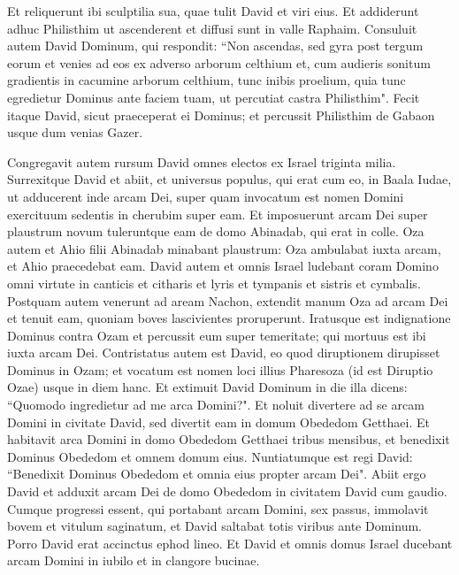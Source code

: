 \begin{biblechapter}
\verse Et reliquerunt ibi sculptilia sua, quae tulit David et viri eius. 
\verse Et addiderunt adhuc Philisthim ut ascenderent et diffusi sunt in valle Raphaim. 
\verse Consuluit autem David Dominum, qui respondit: “Non ascendas, sed gyra post tergum eorum et venies ad eos ex adverso arborum celthium 
\verse et, cum audieris sonitum gradientis in cacumine arborum celthium, tunc inibis proelium, quia tunc egredietur Dominus ante faciem tuam, ut percutiat castra Philisthim". 
\verse Fecit itaque David, sicut praeceperat ei Dominus; et percussit Philisthim de Gabaon usque dum venias Gazer. 
\end{biblechapter}

\begin{biblechapter}  
\verse Congregavit autem rursum David omnes electos ex Israel triginta milia. 
\verse Surrexitque David et abiit, et universus populus, qui erat cum eo, in Baala Iudae, ut adducerent inde arcam Dei, super quam invocatum est nomen Domini exercituum sedentis in cherubim super eam. 
\verse Et imposuerunt arcam Dei super plaustrum novum tuleruntque eam de domo Abinadab, qui erat in colle. Oza autem et Ahio filii Abinadab minabant plaustrum: 
\verse Oza ambulabat iuxta arcam, et Ahio praecedebat eam. 
\verse David autem et omnis Israel ludebant coram Domino omni virtute in canticis et citharis et lyris et tympanis et sistris et cymbalis. 
\verse Postquam autem venerunt ad aream Nachon, extendit manum Oza ad arcam Dei et tenuit eam, quoniam boves lascivientes proruperunt. 
\verse Iratusque est indignatione Dominus contra Ozam et percussit eum super temeritate; qui mortuus est ibi iuxta arcam Dei. 
\verse Contristatus autem est David, eo quod diruptionem dirupisset Dominus in Ozam; et vocatum est nomen loci illius Pharesoza (id est Diruptio Ozae) usque in diem hanc. 
\verse Et extimuit David Dominum in die illa dicens: “Quomodo ingredietur ad me arca Domini?". 
\verse Et noluit divertere ad se arcam Domini in civitate David, sed divertit eam in domum Obededom Getthaei. 
\verse Et habitavit arca Domini in domo Obededom Getthaei tribus mensibus, et benedixit Dominus Obededom et omnem domum eius. 
\verse Nuntiatumque est regi David: “Benedixit Dominus Obededom et omnia eius propter arcam Dei". Abiit ergo David et adduxit arcam Dei de domo Obededom in civitatem David cum gaudio. 
\verse Cumque progressi essent, qui portabant arcam Domini, sex passus, immolavit bovem et vitulum saginatum, 
\verse et David saltabat totis viribus ante Dominum. Porro David erat accinctus ephod lineo.  
\verse Et David et omnis domus Israel ducebant arcam Domini in iubilo et in clangore bucinae. 

\end{biblechapter}
